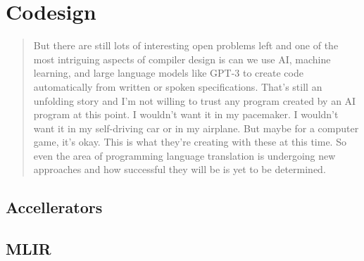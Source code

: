 \chapter{Codesign}

\begin{quotation}
But there are still lots of interesting open problems left and one of the most intriguing aspects of
compiler design is can we use AI, machine learning, and large language models like GPT-3 to create
code automatically from written or spoken specifications. That's still an unfolding story and I'm not willing
to trust any program created by an AI program at this point. I wouldn't want it in my pacemaker. I wouldn't
want it in my self-driving car or in my airplane. But maybe for a computer game, it's okay. This is what
they're creating with these at this time. So even the area of programming language translation is
undergoing new approaches and how successful they will be is yet to be determined.
\cite{aho_oral_history_2022}
\end{quotation}

\section{Accellerators}
\section{MLIR}
